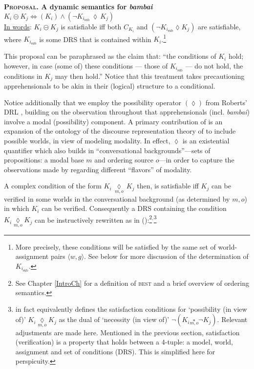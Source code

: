 \ex \label{bb-complex}\textbf{\textsc{Proposal.} A dynamic semantics for \emph{bambai}}\\
$ K_i\circleddash K_j\iff (K_i) \wedge (\neg K_{i_{\text{sub}}}\,\lozenge\,K_j) $\nobreak\\
\uline{In words}: $ K_{i}\circleddash K_j$ is satisfiable iff both $ C_{K_i} $ and $ (\neg K_{i_{\text{sub}}}\lozenge K_j)$ are satisfiable, where $K_{i_{\text{sub}}}$ is some DRS that is contained within $K_{i}$.\footnote{More precisely, these  conditions will be satisfied by the same set of world-assignment pairs $ \langle w,g\rangle $. See below for more discussion of the determination of $K_{i_{\text{sub}}} $.\label{caveat-type}}\xe

\noindent This proposal can be paraphrased as the claim that: ``the conditions of $K_i$ hold; however, in case (some of) these conditions --- those of $K_{i_{\text{sub}}}$ --- do not hold, the conditions in $K_j$ may then hold.'' Notice that this treatment takes precautioning apprehensionals to be akin in their (logical) structure to a conditional. 

Notice additionally that we employ the possibility operator $ (\lozenge) $ from Roberts' DRL \citeyearpar[695, 715]{Roberts1989}, building on the observation throughout that apprehensionals (incl. \textit{bambai}) involve a modal (possibility) component. A primary contribution of \citealt{Roberts1989} is an expansion of the ontology of the discourse representation theory of \citealt{Kamp1981} to include possible worlds, in view of modeling modality. In effect, $ \lozenge$ is an existential quantifier which also builds in ``conversational backgrounds''---sets of propositions: a modal base $ m $ and ordering source $ o $---in order to capture the observations made by \citet[\S2.7]{Kratzer1981} regarding different ``flavors'' of modality. 

A complex condition of the form $K_i\,\underset{m,o}{\lozenge}\,K_j$  then, is satisfiable iff $ K_j $ can be verified in some worlds in the conversational background (as determined by $ m,o $) in which $ K_i $ can be verified. Consequently a DRS containing the condition $ K_i\underset{m,o}{\lozenge}K_j $ can be instructively rewritten as in (\nextx):\footnote{See Chapter \ref{IntroCh} for a definition of \textsc{best} and a brief overview of ordering semantics.}$ ^, $\footnote{\citet{Roberts1989} in fact equivalently defines the satisfaction conditions for `possibility (in view of)' $ K_i\underset{m,o}{\lozenge}K_j$ as the dual of `necessity (in view of)' $ \neg(K_i\underset{m,o}{\square}\neg K_j)$. Relevant adjustments are made here. Mentioned in the previous section, satisfaction (verification) is a property that holds between a 4-tuple: a model, world, assignment and set of conditions (DRS). This is simplified here for perspicuity.}

